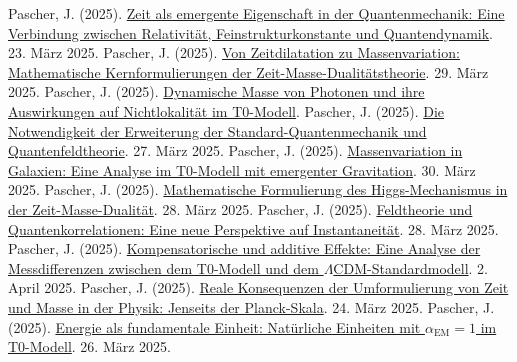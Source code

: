 \documentclass[12pt,a4paper]{article}
\newcommand{\alphaEM}{\alpha_{\text{EM}}}
\theoremstyle{definition}
\theoremstyle{remark}
\begin{document}
	\begin{thebibliography}{99}
		 Pascher, J. (2025). \href{https://github.com/jpascher/T0-Time-Mass-Duality/tree/main/2/pdf/Deutsch/NatEinheitenAlpha1.pdf}{Zeit als emergente Eigenschaft in der Quantenmechanik: Eine Verbindung zwischen Relativität, Feinstrukturkonstante und Quantendynamik}. 23. März 2025.
		 Pascher, J. (2025). \href{https://github.com/jpascher/T0-Time-Mass-Duality/tree/main/2/pdf/Deutsch/MathZeitMasseLagrange.pdf}{Von Zeitdilatation zu Massenvariation: Mathematische Kernformulierungen der Zeit-Masse-Dualitätstheorie}. 29. März 2025.
		 Pascher, J. (2025). \href{https://github.com/jpascher/T0-Time-Mass-Duality/tree/main/2/pdf/Deutsch/DynMassePhotonenNichtlokal.pdf}{Dynamische Masse von Photonen und ihre Auswirkungen auf Nichtlokalität im T0-Modell}.
		 Pascher, J. (2025). \href{https://github.com/jpascher/T0-Time-Mass-Duality/tree/main/2/pdf/Deutsch/NotwendigkeitQMErweiterung.pdf}{Die Notwendigkeit der Erweiterung der Standard-Quantenmechanik und Quantenfeldtheorie}. 27. März 2025.
		 Pascher, J. (2025). \href{https://github.com/jpascher/T0-Time-Mass-Duality/tree/main/2/pdf/Deutsch/MassVarGalaxien.pdf}{Massenvariation in Galaxien: Eine Analyse im T0-Modell mit emergenter Gravitation}. 30. März 2025.
		 Pascher, J. (2025). \href{https://github.com/jpascher/T0-Time-Mass-Duality/tree/main/2/pdf/Deutsch/MathHiggsZeitMasse.pdf}{Mathematische Formulierung des Higgs-Mechanismus in der Zeit-Masse-Dualität}. 28. März 2025.
		 Pascher, J. (2025). \href{https://github.com/jpascher/T0-Time-Mass-Duality/tree/main/2/pdf/Deutsch/FeldtheorieQuanten.pdf}{Feldtheorie und Quantenkorrelationen: Eine neue Perspektive auf Instantaneität}. 28. März 2025.
		 Pascher, J. (2025). \href{https://github.com/jpascher/T0-Time-Mass-Duality/tree/main/2/pdf/Deutsch/MessdifferenzenT0Standard.pdf}{Kompensatorische und additive Effekte: Eine Analyse der Messdifferenzen zwischen dem T0-Modell und dem \(\Lambda\)CDM-Standardmodell}. 2. April 2025.
		 Pascher, J. (2025). \href{https://github.com/jpascher/T0-Time-Mass-Duality/tree/main/2/pdf/Deutsch/JenseitsPlanck.pdf}{Reale Konsequenzen der Umformulierung von Zeit und Masse in der Physik: Jenseits der Planck-Skala}. 24. März 2025.
		 Pascher, J. (2025). \href{https://github.com/jpascher/T0-Time-Mass-Duality/tree/main/2/pdf/Deutsch/NatEinheitenAlpha1.pdf}{Energie als fundamentale Einheit: Natürliche Einheiten mit \(\alphaEM = 1\) im T0-Modell}. 26. März 2025.

\end{thebibliography}
\end{document}
